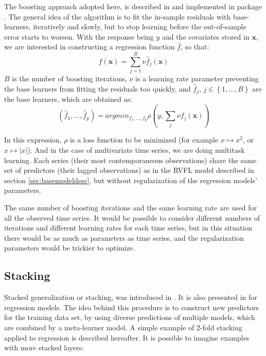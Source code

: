 The boosting approach adopted here, is described in \cite{hothorn2010model} and implemented in  package . The general idea of the algorithm is to fit the in-sample residuals with base-learners, iteratively and slowly, but to stop learning before the out-of-sample error starts to worsen. With the response being $y$ and the covariates stored in  $\textbf{x}$, we are interested in constructing a regression function $\hat{f}$, so that: 
$$
\hat{f}(\textbf{x}) = \sum_{j=1}^B \nu \hat{f}_j(\textbf{x}) 
$$
$B$ is the number of boosting iterations, $\nu$ is a learning rate parameter preventing the base learners from fitting the residuals too quickly, and  $\hat{f}_j$, $j \in \left \lbrace 1, \ldots, B \right \rbrace$ are the base learners, which are obtained as: 
$$
\left(\hat{f}_1, \ldots,  \hat{f}_p\right) = argmin_{f_1, \ldots, f_p}  \rho \left( y, \sum_j \nu f_j\left( \textbf{x} \right) \right) 
$$

In this expression, $\rho$ is a loss function to be minimized (for example $x \mapsto x^2$, or $x \mapsto |x|$). And in the case of multivariate time series, we are doing multitask learning. Each series (their most contemporaneous observations) share the same set of predictors (their lagged observations) as in the RVFL model described in section \ref{sec:basemodeldesc}, but without regularization of the regression models' parameters. 

The same number of boosting iterations and the same learning rate are used for all the observed time series. It would be possible to consider different numbers of iterations and different learning rates for each time series, but in this situation there would be as much as parameters as time series, and the regularization parameters would be trickier to optimize. 

\subsection{Stacking}
\label{sec:rvflstacking}

Stacked generalization or stacking, was introduced in \cite{wolpert1992stacked}. It is also presented in \cite{breiman1996stacked} for regression models. The idea behind this procedure is to construct new predictors for the training data set, by using diverse predictions of multiple models, which are combined by a meta-learner model. A simple example of 2-fold stacking applied to regression is described hereafter. It is possible to imagine examples with more stacked layers:

